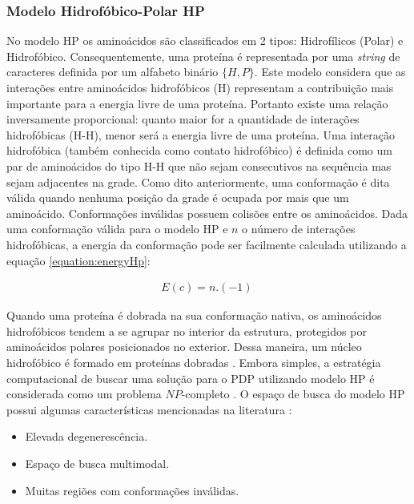 \subsubsection{Modelo Hidrofóbico-Polar HP}
\label{subsubsection:modeloHP}

No modelo HP os aminoácidos são classificados em 2 tipos: Hidrofílicos (Polar) e Hidrofóbico. Consequentemente, uma proteína é representada por uma \textit{string} de caracteres definida por um alfabeto binário $\{H,P\}$. Este modelo considera que as interações entre aminoácidos hidrofóbicos (H) representam a contribuição mais importante para a energia livre de uma proteína. Portanto existe uma relação inversamente proporcional: quanto maior for a quantidade de interações hidrofóbicas (H-H), menor será a energia livre de uma proteína. Uma interação hidrofóbica (também conhecida como contato hidrofóbico) é definida como um par de aminoácidos do tipo H-H que não sejam consecutivos na sequência mas sejam adjacentes na grade.
Como dito anteriormente, uma conformação é dita válida quando nenhuma posição da grade é ocupada por mais que um aminoácido. Conformações inválidas possuem colisões entre os aminoácidos. Dada uma conformação válida para o modelo HP e $n$ o número de interações hidrofóbicas, a energia da conformação pode ser facilmente calculada utilizando a equação \ref{equation:energyHp}: 


\begin{align}
	\label{equation:energyHp}
	E(c) = n. (-1) 
	\
\end{align}


Quando uma proteína é dobrada na sua conformação nativa, os aminoácidos hidrofóbicos tendem a se agrupar no interior da estrutura, protegidos por aminoácidos polares posicionados no exterior. Dessa maneira, um núcleo hidrofóbico é formado em proteínas dobradas \cite{benitez2015algoritmo}. 
Embora simples, a estratégia computacional de buscar uma solução para o PDP utilizando modelo HP é considerada como um problema $NP$-completo \cite{atkins1999intractability, berger1998protein, crescenzi1998complexity}. O espaço de busca do modelo HP possui algumas características mencionadas na literatura \cite{bastolla1997testing, berger1998protein, crescenzi1998complexity, krasnogor1999protein, vendruscolo2000can} :

\begin{itemize}
	\item Elevada degenerescência.
	\item Espaço de busca multimodal.
	\item Muitas regiões com conformações inválidas.
\end{itemize}

